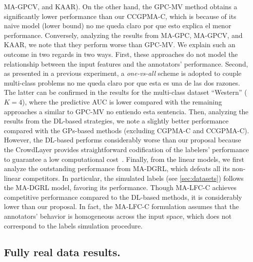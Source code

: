 \documentclass[journal]{IEEEtran}
\newcommand{\comment}[2]{{\color{blue}#1} {\color{red}#2}}
\begin{document}
MA-GPCV, and KAAR). On the other hand, the GPC-MV method obtains a
significantly lower performance than our CCGPMA-C, which is \comment{because
of} its \comment{naive model (lower bound)}{no me queda claro por que
esto explica el menor performance}. Conversely, analyzing the results from
MA-GPC, MA-GPCV, and KAAR, we note that they perform worse than
GPC-MV. We explain such an outcome \comment{in two regards}{in two ways}. First, these
approaches do not model the relationship between the input features
and the annotators' performance. \comment{Second, as presented in a previous
experiment, a \textit{one-vs-all} scheme is adopted to couple
multi-class problems}{no me queda claro por que esta es una de las dos
razones}. The latter can be confirmed in the results for
the multi-class dataset ``Western'' ($K=4$), where the predictive AUC
is lower compared with \comment{the remaining approaches a similar to
GPC-MV}{no entiendo esta sentencia}. Then, analyzing the results from the DL-based strategies, we
note a slightly better performance compared with the GPs-based methods
(excluding CGPMA-C and CCGPMA-C). However, the DL-based performs
considerably worse than our proposal because the CrowdLayer provides
straightforward codification of the labelers' performance to guarantee
a low computational cost~\cite{morales2019scalable1}. Finally, from
the linear models, we first analyze the outstanding performance from
MA-DGRL, which defeats all its non-linear competitors. In particular,
the simulated labels (see \cref{sec:datasets}) follows the MA-DGRL
model, favoring its performance. Though MA-LFC-C achieves competitive
performance compared to the DL-based methods, it is considerably lower
than our proposal. In fact, the MA-LFC-C formulation assumes that the
annotators' behavior is homogeneous across the input space, which does
not correspond to the labels simulation procedure.

\subsection{Fully real data results.}
\end{document}
